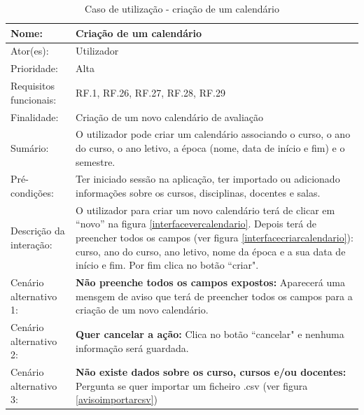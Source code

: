 \documentclass[11pt, twoside]{report}
\begin{document}
\def\arraystretch{1.5}
\begin{table}[H]
	\caption{Caso de utilização - criação de um calendário}
	\label{usecasecriarcalendario}
	\begin{center}	
		\begin{tabularx}{\textwidth}{|l|X|}
			\hline
			\textbf{Nome: }	& \textbf{Criação de um calendário} \\
			\hline
			Ator(es): & Utilizador\\
			\hline
			Prioridade: &  Alta\\
			\hline
			Requisitos funcionais:& RF.1, RF.26, RF.27, RF.28, RF.29\\
			\hline
			Finalidade: & Criação de um novo calendário de avaliação\\
			\hline
			Sumário: & O utilizador pode criar um calendário associando o curso, o ano do curso, o ano letivo, a época (nome, data de início e fim) e o semestre.\\
			\hline
			Pré-condições: & Ter iniciado sessão na aplicação, ter importado ou adicionado informações sobre os cursos, disciplinas, docentes e salas.\\
			\hline
			Descrição da interação: & O utilizador para criar um novo calendário terá de clicar em ``novo'' na figura \ref{interfacevercalendario}. Depois terá de preencher todos os campos (ver figura \ref{interfacecriarcalendario}): curso, ano do curso, ano letivo, nome da época e a sua data de início e fim. Por fim clica no botão ``criar". \\
			\hline
			Cenário alternativo 1: &\textbf{Não preenche todos os campos  expostos:} Aparecerá uma mensgem de aviso que terá de preencher todos os campos para a criação de um novo calendário.\\
			\hline
			Cenário alternativo 2: &\textbf{Quer cancelar a ação:} Clica no botão ``cancelar" e nenhuma informação será guardada.\\
			\hline
			Cenário alternativo 3: &\textbf{Não existe dados sobre os curso, cursos e/ou docentes:} Pergunta se quer importar um ficheiro .csv (ver figura \ref{avisoimportarcsv})\\
			\hline
		\end{tabularx}
	\end{center}
\end{table}
\end{document}
